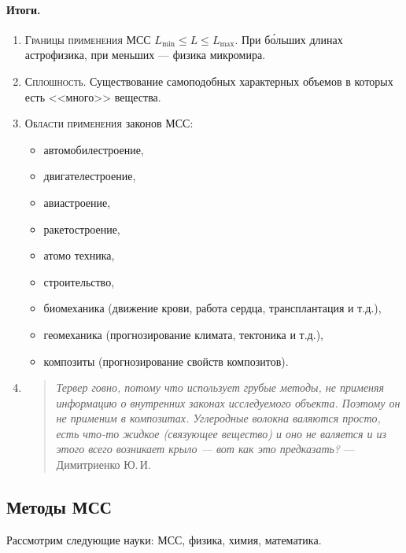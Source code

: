     \paragraph{Итоги.}
    \begin{enumerate}
      \item \textsc{Границы применения} МСС $L_{\min} \leqslant L \leqslant
        L_{\max}$. При б\'{о}льших
        длинах астрофизика, при меньших --- физика микромира.

      \item \textsc{Сплошность.} Существование самоподобных характерных объемов
        в которых есть <<много>>
        вещества.

      \item \textsc{Области применения} законов МСС:
        \begin{itemize}[label=--]
          \item автомобилестроение,
          \item двигателестроение,
          \item авиастроение,
          \item ракетостроение,
          \item атомо техника,
          \item строительство,
          \item биомеханика (движение крови, работа сердца, трансплантация и
            т.д.),
          \item геомеханика (прогнозирование климата, тектоника и т.д.),
          \item композиты (прогнозирование свойств композитов).
        \end{itemize}
        \item
		  \begin{quotation}
				\emph{Тервер говно, потому что использует грубые методы, не применяя информацию о внутренних
				законах исследуемого объекта. Поэтому он не применим в композитах. Углеродные волокна 
				валяются просто, есть что-то жидкое (связующее вещество) и оно не валяется и из этого 
      всего возникает крыло --- вот как это предказать?}
				\flushright--- Димитриенко Ю.\,И.
			\end{quotation}
    \end{enumerate}


\subsection{Методы МСС}
Рассмотрим следующие науки: МСС, физика, химия, математика.

